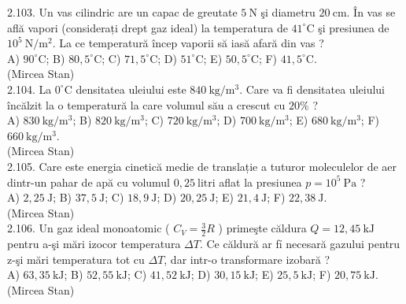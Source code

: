 2.103. Un vas cilindric are un capac de greutate $5 \mathrm{~N}$ şi diametru $20 \mathrm{~cm}$. În vas se află vapori (considerați drept gaz ideal) la temperatura de $41^{\circ} \mathrm{C}$ şi presiunea de $10^{5} \mathrm{~N} / \mathrm{m}^{2}$. La ce temperatură încep vaporii să iasă afară din vas ?\\ A) $90^{\circ} \mathrm{C}$; B) $80,5^{\circ} \mathrm{C}$; C) $71,5^{\circ} \mathrm{C}$; D) $51^{\circ} \mathrm{C}$; E) $50,5^{\circ} \mathrm{C}$; F) $41,5^{\circ} \mathrm{C}$.\\ (Mircea Stan)\\

2.104. La $0^{\circ} \mathrm{C}$ densitatea uleiului este $840 \mathrm{~kg} / \mathrm{m}^{3}$. Care va fi densitatea uleiului încălzit la o temperatură la care volumul său a crescut cu $20 \%$ ?\\ A) $830 \mathrm{~kg} / \mathrm{m}^{3}$; B) $820 \mathrm{~kg} / \mathrm{m}^{3}$; C) $720 \mathrm{~kg} / \mathrm{m}^{3}$; D) $700 \mathrm{~kg} / \mathrm{m}^{3}$; E) $680 \mathrm{~kg} / \mathrm{m}^{3}$; F) $660 \mathrm{~kg} / \mathrm{m}^{3}$.\\ (Mircea Stan)\\

2.105. Care este energia cinetică medie de translație a tuturor moleculelor de aer dintr-un pahar de apă cu volumul $0,25 \mathrm{~litri}$ aflat la presiunea $p=10^{5} \mathrm{~Pa}$ ?\\ A) $2,25 \mathrm{~J}$; B) $37,5 \mathrm{~J}$; C) $18,9 \mathrm{~J}$; D) $20,25 \mathrm{~J}$; E) $21,4 \mathrm{~J}$; F) $22,38 \mathrm{~J}$.\\ (Mircea Stan)\\

2.106. Un gaz ideal monoatomic ( $C_{V}=\frac{3}{2} R$ ) primeşte căldura $Q=12,45 \mathrm{~kJ}$ pentru a-şi mări izocor temperatura $\Delta T$. Ce căldură ar fỉ necesară gazului pentru z-şi mări temperatura tot cu $\Delta T$, dar intr-o transformare izobară ?\\ A) $63,35 \mathrm{~kJ}$; B) $52,55 \mathrm{~kJ}$; C) $41,52 \mathrm{~kJ}$; D) $30,15 \mathrm{~kJ}$; E) $25,5 \mathrm{~kJ}$; F) $20,75 \mathrm{~kJ}$.\\ (Mircea Stan)\\

